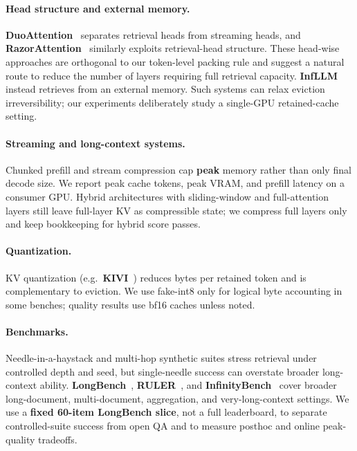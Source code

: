 \documentclass[11pt,a4paper]{article}
\begin{document}
\paragraph{Head structure and external memory.}
\textbf{DuoAttention}~\cite{xiao2024duoattention} separates retrieval heads from streaming heads, and \textbf{RazorAttention}~\cite{tang2024razorattention} similarly exploits retrieval-head structure. These head-wise approaches are orthogonal to our token-level packing rule and suggest a natural route to reduce the number of layers requiring full retrieval capacity. \textbf{InfLLM}~\cite{xiao2024infllm} instead retrieves from an external memory. Such systems can relax eviction irreversibility; our experiments deliberately study a single-GPU retained-cache setting.

\paragraph{Streaming and long-context systems.}
Chunked prefill and stream compression cap \textbf{peak} memory rather than only final decode size. We report peak cache tokens, peak VRAM, and prefill latency on a consumer GPU. Hybrid architectures with sliding-window and full-attention layers still leave full-layer KV as compressible state; we compress full layers only and keep bookkeeping for hybrid score passes.

\paragraph{Quantization.}
KV quantization (e.g.\ \textbf{KIVI}~\cite{liu2024kivi}) reduces bytes per retained token and is complementary to eviction. We use fake-int8 only for logical byte accounting in some benches; quality results use bf16 caches unless noted.

\paragraph{Benchmarks.}
Needle-in-a-haystack and multi-hop synthetic suites stress retrieval under controlled depth and seed, but single-needle success can overstate broader long-context ability. \textbf{LongBench}~\cite{bai2024longbench}, \textbf{RULER}~\cite{hsieh2024ruler}, and \textbf{InfinityBench}~\cite{zhang2024infinitybench} cover broader long-document, multi-document, aggregation, and very-long-context settings. We use a \textbf{fixed 60-item LongBench slice}, not a full leaderboard, to separate controlled-suite success from open QA and to measure posthoc and online peak-quality tradeoffs.
\end{document}

